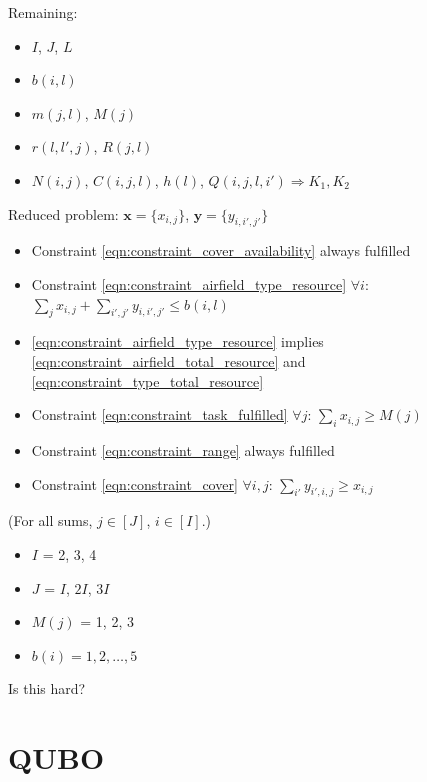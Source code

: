 \documentclass{article}
\begin{document}
\noindent
Remaining:
\begin{itemize}
\item $I$, $J$, $L$
\item $b(i, l)$
\item $m(j, l)$, $M(j)$
\item $r(l, l', j)$, $R(j, l)$
\item $N(i, j)$, $C(i, j, l)$, $h(l)$, $Q(i, j, l, i') \Rightarrow K_1, K_2$
\end{itemize}

\noindent 
Reduced problem:
$\mathbf x = \{x_{i, j}\}$, $\mathbf y = \{y_{i, i' ,j'}\}$
\begin{itemize}
    \item Constraint \eqref{eqn:constraint_cover_availability} always fulfilled
    \item Constraint \eqref{eqn:constraint_airfield_type_resource} $\forall i$: $\sum_j x_{i,j} + \sum_{i', j'} y_{i, i', j'}  \leq b(i,l)$
    \item \eqref{eqn:constraint_airfield_type_resource} implies \eqref{eqn:constraint_airfield_total_resource} and \eqref{eqn:constraint_type_total_resource}
    \item Constraint \eqref{eqn:constraint_task_fulfilled} $\forall j$: $\sum_{i} x_{i, j} \geq M(j)$
    \item Constraint \eqref{eqn:constraint_range} always fulfilled
    \item Constraint \eqref{eqn:constraint_cover} $\forall i, j$: $\sum_{i'} y_{i', i, j} \geq x_{i, j}$
\end{itemize}
(For all sums, $j \in [J]$, $i \in [I]$.)

\begin{itemize}
\item $I$ = 2, 3, 4
\item $J$ = $I$, $2I$, $3I$
\item $M(j)$ = 1, 2, 3
\item $b(i) = 1, 2, \ldots, 5$
\end{itemize}
Is this hard?

\section{QUBO}
\end{document}
